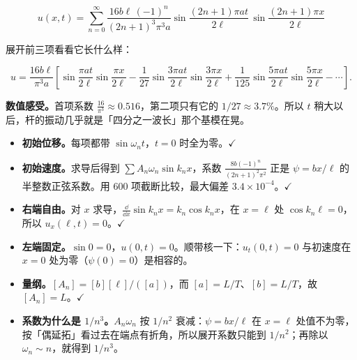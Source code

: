 
\[
\boxed{\;
u(x,t)=\sum_{n=0}^{\infty}\frac{16b\ell\,(-1)^n}{(2n+1)^3\pi^3a}
\sin\frac{(2n+1)\pi at}{2\ell}\,
\sin\frac{(2n+1)\pi x}{2\ell}
\;}
\]

展开前三项看看它长什么样：

\[
u=\frac{16b\ell}{\pi^3a}\left[
\sin\frac{\pi at}{2\ell}\sin\frac{\pi x}{2\ell}
-\frac{1}{27}\sin\frac{3\pi at}{2\ell}\sin\frac{3\pi x}{2\ell}
+\frac{1}{125}\sin\frac{5\pi at}{2\ell}\sin\frac{5\pi x}{2\ell}-\cdots
\right].
\]

\textbf{数值感受。}首项系数 $\frac{16}{\pi^3}\approx0.516$，第二项只有它的 $1/27\approx3.7\%$。所以 $t$ 稍大以后，杆的振动几乎就是「四分之一波长」那个基模在晃。


\begin{itemize}
  \item \textbf{初始位移。}每项都带 $\sin\omega_nt$，$t=0$ 时全为零。$\checkmark$
  \item \textbf{初始速度。}求导后得到 $\sum A_n\omega_n\sin k_nx$，系数 $\frac{8b(-1)^n}{(2n+1)^2\pi^2}$ 正是 $\psi=bx/\ell$ 的半整数正弦系数。用 600 项截断比较，最大偏差 $3.4\times10^{-4}$。$\checkmark$
  \item \textbf{右端自由。}对 $x$ 求导，$\frac{\dd}{\dd x}\sin k_nx=k_n\cos k_nx$，在 $x=\ell$ 处 $\cos k_n\ell=0$，所以 $u_x(\ell,t)=0$。$\checkmark$
  \item \textbf{左端固定。}$\sin0=0$，$u(0,t)=0$。顺带核一下：$u_t(0,t)=0$ 与初速度在 $x=0$ 处为零（$\psi(0)=0$）是相容的。
  \item \textbf{量纲。}$[A_n]=[b][\ell]/([a])$，而 $[a]=L/T$、$[b]=L/T$，故 $[A_n]=L$。$\checkmark$
  \item \textbf{系数为什么是 $1/n^3$。}$A_n\omega_n$ 按 $1/n^2$ 衰减：$\psi=bx/\ell$ 在 $x=\ell$ 处值不为零，按「偶延拓」看过去在端点有折角，所以展开系数只能到 $1/n^2$；再除以 $\omega_n\sim n$，就得到 $1/n^3$。
\end{itemize}




